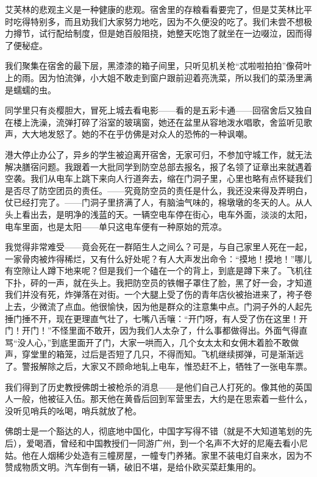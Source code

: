 \par 艾芙林的悲观主义是一种健康的悲观。宿舍里的存粮看看要完了，但是艾芙林比平时吃得特别多，而且劝我们大家努力地吃，因为不久便没的吃了。我们未尝不想极力撙节，试行配给制度，但是她百般阻挠，她整天吃饱了就坐在一边啜泣，因而得了便秘症。
\par 我们聚集在宿舍的最下层，黑漆漆的箱子间里，只听见机关枪“忒啦啦拍拍”像荷叶上的雨。因为怕流弹，小大姐不敢走到窗户跟前迎着亮洗菜，所以我们的菜汤里满是蠕蠕的虫。
\par 同学里只有炎樱胆大，冒死上城去看电影——看的是五彩卡通——回宿舍后又独自在楼上洗澡，流弹打碎了浴室的玻璃窗，她还在盆里从容地泼水唱歌，舍监听见歌声，大大地发怒了。她的不在乎仿佛是对众人的恐怖的一种讽嘲。
\par 港大停止办公了，异乡的学生被迫离开宿舍，无家可归，不参加守城工作，就无法解决膳宿问题。我跟着一大批同学到防空总部去报名，报了名领了证章出来就遇着空袭。我们从电车上跳下来向人行道奔去，缩在门洞子里，心里也略有点怀疑我们是否尽了防空团员的责任。——究竟防空员的责任是什么，我还没来得及弄明白，仗已经打完了。——门洞子里挤满了人，有脑油气味的，棉墩墩的冬天的人。从人头上看出去，是明净的浅蓝的天。一辆空电车停在街心，电车外面，淡淡的太阳，电车里面，也是太阳——单只这电车便有一种原始的荒凉。
\par 我觉得非常难受——竟会死在一群陌生人之间么？可是，与自己家里人死在一起，一家骨肉被炸得稀烂，又有什么好处呢？有人大声发出命令：“摸地！摸地！”哪儿有空隙让人蹲下地来呢？但是我们一个磕在一个的背上，到底是蹲下来了。飞机往下扑，砰的一声，就在头上。我把防空员的铁帽子罩住了脸，黑了好一会，才知道我们并没有死，炸弹落在对街。一个大腿上受了伤的青年店伙被抬进来了，袴子卷上去，少微流了点血。他很愉快，因为他是群众的注意集中点。门洞子外的人起先捶门捶不开，现在更理直气壮了，七嘴八舌嚷：“开门呀，有人受了伤在这里！开门！开门！”不怪里面不敢开，因为我们人太杂了，什么事都做得出。外面气得直骂“没人心，”到底里面开了门，大家一哄而入，几个女太太和女佣木着脸不敢做声，穿堂里的箱笼，过后是否短了几只，不得而知。飞机继续掷弹，可是渐渐远了。警报解除之后，大家又不顾命地轧上电车，惟恐赶不上，牺牲了一张电车票。
\par 我们得到了历史教授佛朗士被枪杀的消息——是他们自己人打死的。像其他的英国人一般，他被征入伍。那天他在黄昏后回到军营里去，大约是在思索着一些什么，没听见哨兵的吆喝，哨兵就放了枪。
\par 佛朗士是一个豁达的人，彻底地中国化，中国字写得不错（就是不大知道笔划的先后），爱喝酒，曾经和中国教授们一同游广州，到一个名声不大好的尼庵去看小尼姑。他在人烟稀少处造有三幢房屋，一幢专门养猪。家里不装电灯自来水，因为不赞成物质文明。汽车倒有一辆，破旧不堪，是给仆欧买菜赶集用的。
